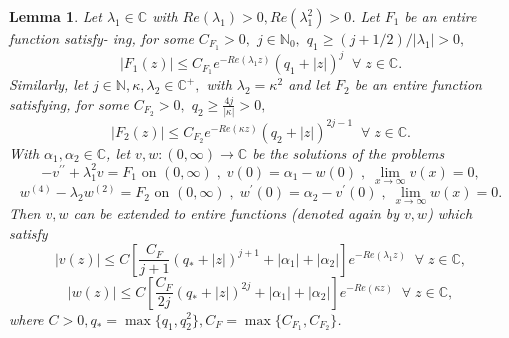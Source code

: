 \documentclass[10pt,a4paper]{amsart}
\newtheorem{lemma}{Lemma}
\begin{document}
\begin{lemma}
\label{lemma_aux0} Let $\lambda_1 \in \mathbb{C}$ with $Re(\lambda_1)>0,Re(\lambda_1^{2})>0$. Let $F_1$ be an entire function satisfy- ing, for some $%
C_{F_1}>0,$ $j\in \mathbb{N}_{0},$ $q_1\geq (j+1/2)/|\lambda_1|>0,$ 
\begin{equation*}
\left\vert F_1(z)\right\vert \leq C_{F_1}e^{-Re(\lambda_1 z)}\left( q_1+\left\vert
z\right\vert \right) ^{j} \; \; \forall \; z\in \mathbb{C}.
\end{equation*}%
Similarly, let $j\in \mathbb{N}, \kappa, \lambda_2 \in \mathbb{C}^{+},$ with $\lambda_2 = \kappa^2$ and let $F_2$ be an entire function satisfying, for some $C_{F_2}>0,$ $q_2\geq \frac{4j}{|\kappa|}>0,$
\begin{equation*}
\left\vert F_2(z)\right\vert \leq C_{F_2}e^{-Re(\kappa z)}\left( q_2+\left\vert
z\right\vert \right) ^{2j-1} \; \; \forall \; z\in \mathbb{C}.
\end{equation*}%
With $\alpha_1, \alpha_2 \in \mathbb{C}$, let $v,w:(0,\infty )\rightarrow \mathbb{C}$ be the solutions of the problems
%
\begin{equation*}
-v^{\prime \prime }+\lambda_1^{2}v=F_1\text{ on }(0,\infty
) \; , \; v(0)=\alpha_1 - w(0) \; , \; \lim_{x\rightarrow \infty }v(x)=0,
\end{equation*}%
\begin{equation*}
w^{(4)}-\lambda_2 w^{(2)}=F_2\text{ on }(0,\infty ) \; , \; w^{\prime }(0)=\alpha_2 - v^{\prime }(0) \; , \; \lim_{x\rightarrow \infty}w(x)=0.
\end{equation*}%
Then $v,w$ can be extended to entire functions (denoted again by $v,w$) which satisfy
\begin{equation*}
\left\vert v(z)\right\vert \leq C \left[ \frac{C_{F}}{j+1}\left(
q_*+\left\vert z\right\vert \right) ^{j+1}+\left\vert \alpha_1 \right\vert+\left\vert \alpha_2 \right\vert \right] e^{-Re(\lambda_1 z)} \; \; \forall \; z\in \mathbb{C},
\end{equation*}%
\begin{equation*}
\left\vert w(z)\right\vert \leq C \left[ \frac{C_{F}}{2j}\left( q_*+\left\vert z\right\vert \right) ^{2j}+\left\vert \alpha_1 \right\vert+\left\vert \alpha_2 \right\vert \right] e^{-Re(\kappa z)} \; \; \forall \; z\in \mathbb{C},
\end{equation*}%
where $C>0,q_* = \max \{q_1,q_2^2 \},C_F = \max \{C_{F_1},C_{F_2} \}$.
\end{lemma}
\end{document}
